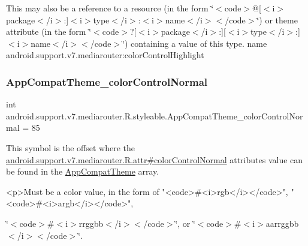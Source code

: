 This may also be a reference to a resource (in the form \char`\"{}$<$code$>$@\mbox{[}$<$i$>$package$<$/i$>$\+:\mbox{]}$<$i$>$type$<$/i$>$\+:$<$i$>$name$<$/i$>$$<$/code$>$\char`\"{}) or theme attribute (in the form \char`\"{}$<$code$>$?\mbox{[}$<$i$>$package$<$/i$>$\+:\mbox{]}\mbox{[}$<$i$>$type$<$/i$>$\+:\mbox{]}$<$i$>$name$<$/i$>$$<$/code$>$\char`\"{}) containing a value of this type.  name android.\+support.\+v7.\+mediarouter\+:color\+Control\+Highlight \mbox{\label{classandroid_1_1support_1_1v7_1_1mediarouter_1_1R_1_1styleable_a5fa81c05a9dc3325bf0d8bb56ae34321}} 
\subsubsection{\texorpdfstring{App\+Compat\+Theme\+\_\+color\+Control\+Normal}{AppCompatTheme\_colorControlNormal}}
{\footnotesize\ttfamily int android.\+support.\+v7.\+mediarouter.\+R.\+styleable.\+App\+Compat\+Theme\+\_\+color\+Control\+Normal = 85\hspace{0.3cm}{\ttfamily [static]}}

This symbol is the offset where the \hyperlink{classandroid_1_1support_1_1v7_1_1mediarouter_1_1R_1_1attr_a509852bd1ac74db181f64f0400343421}{android.\+support.\+v7.\+mediarouter.\+R.\+attr\#color\+Control\+Normal} attribute\textquotesingle{}s value can be found in the \hyperlink{classandroid_1_1support_1_1v7_1_1mediarouter_1_1R_1_1styleable_a4e3d3900c75d49aeb2f283cac00214d6}{App\+Compat\+Theme} array.

\begin{DoxyVerb}      <p>Must be a color value, in the form of "<code>#<i>rgb</i></code>", "<code>#<i>argb</i></code>",
\end{DoxyVerb}
 \char`\"{}$<$code$>$\#$<$i$>$rrggbb$<$/i$>$$<$/code$>$\char`\"{}, or \char`\"{}$<$code$>$\#$<$i$>$aarrggbb$<$/i$>$$<$/code$>$\char`\"{}. 

